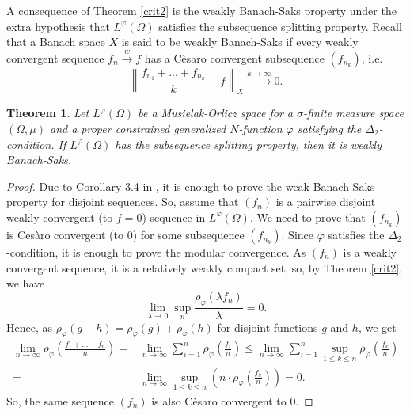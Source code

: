 \documentclass[11pt,a4paper]{amsart}
\newtheorem{teorema}[definicion]{Theorem}
\newcommand{\lphi}{{L^{\varphi}(\Omega)}}
\begin{document}
A consequence of Theorem \ref{crit2} is the weakly Banach-Saks property under the extra hypothesis that $\lphi$ satisfies the subsequence splitting property. Recall that a Banach space $X$ is said to be weakly Banach-Saks if every weakly convergent sequence $f_n\xrightarrow{w} f$ has a Cèsaro convergent subsequence $(f_{n_k})$, i.e.
$$
\left\lVert\frac{f_{n_1}+...+f_{n_k}}{k}-f\right\rVert_X\xrightarrow{k\rightarrow \infty}0.
$$

\begin{teorema}\label{wBS2}
Let $\lphi$ be a Musielak-Orlicz space for a $\sigma$-finite measure space $(\Omega,\mu)$ and a proper constrained generalized $N$-function $\varphi$ satisfying the $\Delta_2$-condition. If $\lphi$ has the subsequence splitting property, then it is weakly Banach-Saks. %
\end{teorema}


\begin{proof}
Due to Corollary 3.4 in \cite{FR}, it is enough to prove the weak Banach-Saks property for disjoint sequences. So, assume that $(f_n)$ is a pairwise disjoint weakly convergent (to $f=0$) sequence in $\lphi$. We need to prove that $(f_{n_{k}})$ is Ces\`aro convergent (to $0$) for some subsequence $(f_{n_{k}})$. Since $\varphi$ satisfies the $\Delta_2$-condition, it is enough to prove the modular convergence. As $(f_n)$ is a weakly convergent sequence, it is a relatively weakly compact set, so, by Theorem \ref{crit2}, we have
$$
\lim_{\lambda\rightarrow 0} \sup_{n} \frac{\rho_{\varphi}(\lambda f_n)}{\lambda}=0.
$$
Hence, as $\rho_{\varphi}(g+h)=\rho_{\varphi}(g)+\rho_\varphi(h)$ for disjoint functions $g$ and $h$, we get
\begin{align*}
    \lim_{n\rightarrow\infty}\rho_{\varphi}\left(\frac{f_1+...+f_n}{n}\right)
    ={} &   \lim_{n\rightarrow\infty}\sum_{i=1}^n \rho_{\varphi}\left(\frac{f_i}{n}\right)
    \leq\lim_{n\rightarrow\infty}\sum_{i=1}^n \sup_{1\leq k\leq n}\rho_{\varphi}\left(\frac{f_k}{n}\right)\\
    ={} &   \lim_{n\rightarrow\infty} \sup_{1\leq k\leq n}\left(n\cdot\rho_{\varphi}\left(\frac{f_k}{n}\right)\right) = 0.
\end{align*}
So, the same sequence $(f_n)$ is also Cèsaro convergent to $0$.
\end{proof}
\end{document}

